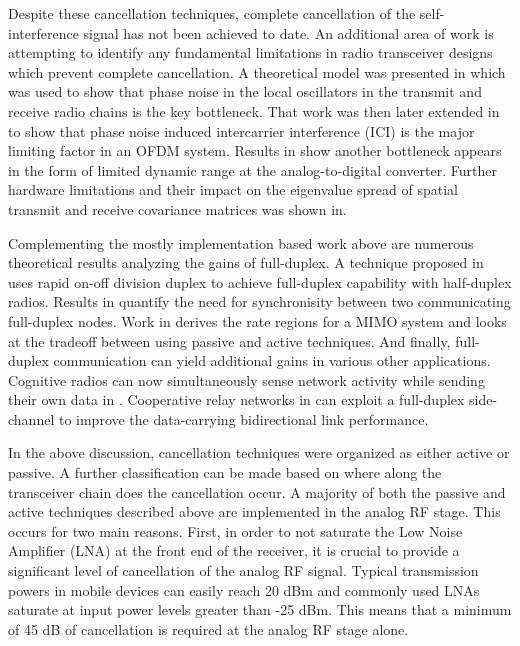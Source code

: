 \documentclass[12pt, journal,draftcls,letterpaper,onecolumn]{IEEEtran}
\begin{document}
Despite these cancellation techniques, complete cancellation of the self-interference signal has not been achieved to date.  An additional area of work is attempting to identify any fundamental limitations in radio transceiver designs which prevent complete cancellation.  A theoretical model was presented in \cite{2012_Achal_Asilomar,2013_Achal_TVT_Phase} which was used to show that phase noise in the local oscillators in the transmit and receive radio chains is the key bottleneck.  That work was then later extended in \cite{2013_Ashu_Globecom} to show that phase noise induced intercarrier interference (ICI) is the major limiting factor in an OFDM system.  Results in \cite{2012_Aalto_Asilomar, 2012_MIMO_relay} show another bottleneck appears in the form of limited dynamic range at the analog-to-digital converter.  Further hardware limitations and their impact on the eigenvalue spread of spatial transmit and receive covariance matrices was shown in\cite{2012_Hardwar_limitations}.  

Complementing the mostly implementation based work above are numerous theoretical results analyzing the gains of full-duplex.  A technique proposed in \cite{2010_vitual_FD} uses rapid on-off division duplex to achieve full-duplex capability with half-duplex radios.  Results in \cite{2012_Achal_comsnets} quantify the need for synchronisity between two communicating full-duplex nodes.  Work in \cite{2013_CISS_Aalto} derives the rate regions for a MIMO system and looks at the tradeoff between using passive and active techniques.  And finally, full-duplex communication can yield additional gains in various other applications.  Cognitive radios can now simultaneously sense network activity while sending  their own data in \cite{2012_Ashu_rates}.  Cooperative relay networks in \cite{2013_Jingwen_TWC} can exploit a full-duplex side-channel to improve the data-carrying bidirectional link performance.  

In the above discussion, cancellation techniques were organized as either active or passive.  A further classification can be made based on where along the transceiver chain does the cancellation occur.  A majority of both the passive and active techniques described above are implemented in the analog RF stage.  This occurs for two main reasons.  First, in order to not saturate the Low Noise Amplifier (LNA) at the front end of the receiver, it is crucial to provide a significant level of cancellation of the analog RF signal.  Typical transmission powers in mobile devices can easily reach 20 dBm and commonly used LNAs saturate at input power levels greater than -25 dBm.  This means that a minimum of 45 dB of cancellation is required at the analog RF stage alone.  
\end{document}
